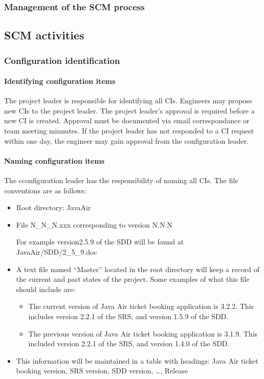 \documentclass{scrartcl}
\begin{document}
\subsubsection{Management of the SCM process}
\subsection{SCM activities}
\subsubsection{Configuration identification}
\paragraph{Identifying configuration items}
The project leader is responsible for identifying all CIs.  Engineers may propose new CIs to the project leader.  The project leader's approval is required before a new CI is created.  Approval must be documented via email correspondance or team meeting minnutes.  If the project leader has not responded to a CI request within one day, the engineer may gain approval from the configuration leader.
\paragraph{Naming configuration items}
The cconfiguration leader has the responsibility of naming all CIs.  The file conventions are as follows:
\begin{itemize}[label={}, leftmargin=.5in]
\item Root directory: JavaAir

\item File N\_N\_N.xxx corresponding to version N.N.N
\setlength{\parindent}{5ex}
\par For example version2.5.9 of the SDD will be found at JavaAir/SDD/2\_5\_9.doc
\item A text file named ``Master'' located in the root directory will keep a record of the current and past states of the project.  Some examples of what this file should include are:
\begin{itemize}[label={}, leftmargin=.5in]
\item The current version of Java Air ticket booking application is 3.2.2.  This includes version 2.2.1 of the SRS, and version 1.5.9 of the SDD.
\item The previous version of Java Air ticket booking application is 3.1.9.  This included version 2.2.1 of the SRS, and version 1.4.0 of the SDD.
 \end{itemize}
 \item This information will be maintained in a table with headings: Java Air ticket booking version, SRS version, SDD version, \ldots, Release
\end{itemize}
\end{document}

